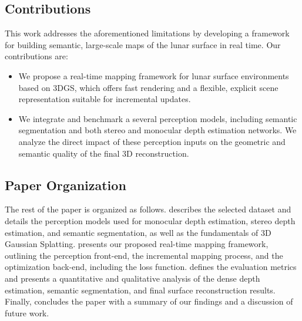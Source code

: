 \subsection{Contributions}
This work addresses the aforementioned limitations by developing a framework for building semantic, large-scale maps of the lunar surface in real time. Our contributions are:
\begin{itemize}
	\item We propose a real-time mapping framework for lunar surface environments based on 3DGS, which offers fast rendering and a flexible, explicit scene representation suitable for incremental updates.
	\item We integrate and benchmark a several perception models, including semantic segmentation and both stereo and monocular depth estimation networks. We analyze the direct impact of these perception inputs on the geometric and semantic quality of the final 3D reconstruction.
\end{itemize}


\subsection{Paper Organization}
The rest of the paper is organized as follows.  describes the selected dataset and details the perception models used for monocular depth estimation, stereo depth estimation, and semantic segmentation, as well as the fundamentals of 3D Gaussian Splatting.  presents our proposed real-time mapping framework, outlining the perception front-end, the incremental mapping process, and the optimization back-end, including the loss function.  defines the evaluation metrics and presents a quantitative and qualitative analysis of the dense depth estimation, semantic segmentation, and final surface reconstruction results. Finally,  concludes the paper with a summary of our findings and a discussion of future work.


